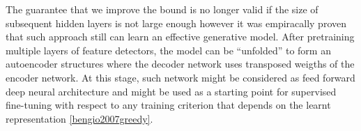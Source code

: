\documentclass[../report/report.tex]{subfiles}
\begin{document}
 The guarantee that we improve the bound is no longer valid if the size of subsequent hidden layers is not large enough
 however it was empiracally proven that such approach still can learn an effective generative model. After pretraining multiple layers of feature detectors, the model can be ``unfolded'' to form an autoencoder structures 
where the decoder network uses transposed weigths of the encoder network. At this stage, such network might be considered
as feed forward deep neural architecture and might be used as a starting point for supervised fine-tuning with respect to any
training criterion that depends on the learnt representation \ref{bengio2007greedy}.
 
 \def\layersep{2.5cm}
\begin{figure}[!h]
\begin{center}
\end{center}
\end{figure}
\end{document}
